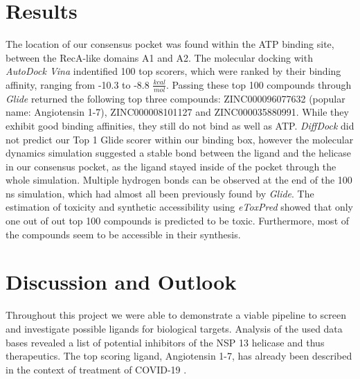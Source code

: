 \documentclass[11pt, letterpaper, titlepage]{article}
\renewcommand{\cite}{\parencite}
\begin{document}
\section{Results}
The location of our consensus pocket was found within the ATP binding site, between the RecA-like domains A1 and A2. The molecular docking with \textit{AutoDock Vina} indentified 100 top scorers, which were ranked by their binding affinity, ranging from -10.3 to -8.8 $\frac{kcal}{mol}$. Passing these top 100 compounds through \textit{Glide} returned the following top three compounds: ZINC000096077632 (popular name: Angiotensin 1-7), ZINC000008101127 and ZINC000035880991. While they exhibit good binding affinities, they still do not bind as well as ATP. \textit{DiffDock} did not predict our Top 1 Glide scorer within our binding box, however the molecular dynamics simulation suggested a stable bond between the ligand and the helicase in our consensus pocket, as the ligand stayed inside of the pocket through the whole simulation. Multiple hydrogen bonds can be observed at the end of the 100 ns simulation, which had almost all been previously found by \textit{Glide}. The estimation of toxicity and synthetic accessibility using \textit{eToxPred} showed that only one out of out top 100 compounds is predicted to be toxic. Furthermore, most of the compounds seem to be accessible in their synthesis.

\FloatBarrier

\section{Discussion and Outlook}
Throughout this project we were able to demonstrate a viable pipeline to screen and investigate possible ligands for biological targets. Analysis of the used data bases revealed a list of potential inhibitors of the NSP 13 helicase and thus therapeutics. The top scoring ligand, Angiotensin 1-7, has already been described in the context of treatment of COVID-19 \cite{angio}. 


\pagebreak
\FloatBarrier
\renewcommand{\bibname}{References}  %
\printbibliography
\end{document}
